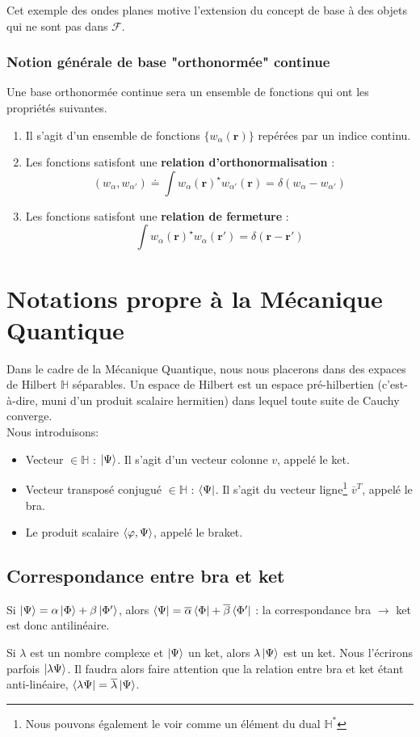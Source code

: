 \documentclass[../notesdecours.tex]{subfiles}
\begin{document}
Cet exemple des ondes planes motive l'extension du concept de base à des objets qui ne sont pas dans $\mathcal{F}$.

\subsubsection{Notion générale de base "orthonormée" continue}
Une base orthonormée continue sera un ensemble de fonctions qui ont les propriétés suivantes.
\begin{enumerate}
\item Il s'agit d'un ensemble de fonctions $\{ w_\alpha(\bm{r})\}$ repérées par un indice continu. \\

\item Les fonctions satisfont une \textbf{relation d'orthonormalisation} :
$$(w_{\alpha}, w_{\alpha'}) \doteq \int w_{\alpha}(\bm{r})^\star w_{\alpha'}(\bm{r}) = \delta(w_{\alpha} - w_{\alpha'})$$

\item Les fonctions satisfont une \textbf{relation de fermeture} :
$$\int w_{\alpha}(\bm{r})^\star w_{\alpha}(\bm{r}') = \delta(\bm{r}-\bm{r}')$$
\end{enumerate}
\section{Notations propre à la Mécanique Quantique}
Dans le cadre de la Mécanique Quantique, nous nous placerons dans des expaces de Hilbert $\mathbb{H}$ séparables. Un espace de Hilbert est un espace pré-hilbertien (c'est-à-dire, muni d'un produit scalaire hermitien) dans lequel toute suite de Cauchy converge. \\

Nous introduisons:
\begin{itemize}
\item Vecteur $\in \mathbb{H}$ : $\ket{\Psi}$. Il s'agit d'un vecteur colonne $v$, appelé le ket.
\item Vecteur transposé conjugué $\in \mathbb{H}$ : $\bra{\Psi}$. Il s'agit du vecteur ligne\footnote{Nous pouvons également le voir comme un élément du dual $\mathbb{H}^*$} $\overline{v}^T$, appelé le bra.
\item Le produit scalaire $\braket{\varphi,\Psi}$, appelé le braket.
\end{itemize}
\subsection{Correspondance entre bra et ket}
Si $\ket{\Psi} = \alpha \ket{\Phi} + \beta\ket{\Phi'}$, alors $\bra{\Psi} = \overline{\alpha}\bra{\Phi}+\overline{\beta}\bra{\Phi'}$ : la correspondance bra $\rightarrow$ ket est donc antilinéaire. 
\begin{remark} Si $\lambda$ est un nombre complexe et $\ket{\Psi}$ un ket, alors $\lambda\ket{\Psi}$ est un ket. Nous l'écrirons parfois $\ket{\lambda\Psi}$. Il faudra alors faire attention que la relation entre bra et ket étant anti-linéaire, $\bra{\lambda\Psi} = \overline{\lambda}\ket{\Psi}$. \end{remark}
\end{document}

